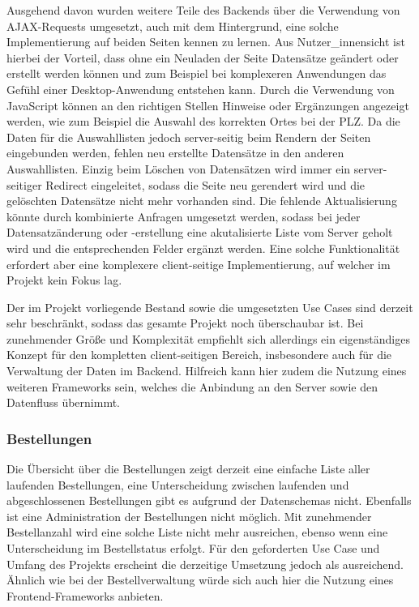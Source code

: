 		Ausgehend davon wurden weitere Teile des Backends über die Verwendung von AJAX-Requests umgesetzt, auch mit dem Hintergrund, eine solche Implementierung auf beiden Seiten kennen zu lernen. Aus Nutzer\_innensicht ist hierbei der Vorteil, dass ohne ein Neuladen der Seite Datensätze geändert oder erstellt werden können und zum Beispiel bei komplexeren Anwendungen das Gefühl einer Desktop-Anwendung entstehen kann. Durch die Verwendung von JavaScript können an den richtigen Stellen Hinweise oder Ergänzungen angezeigt werden, wie zum Beispiel die Auswahl des korrekten Ortes bei der PLZ. Da die Daten für die Auswahllisten jedoch server-seitig beim Rendern der Seiten eingebunden werden, fehlen neu erstellte Datensätze in den anderen Auswahllisten. Einzig beim Löschen von Datensätzen wird immer ein server-seitiger Redirect eingeleitet, sodass die Seite neu gerendert wird und die gelöschten Datensätze nicht mehr vorhanden sind. Die fehlende Aktualisierung könnte durch kombinierte Anfragen umgesetzt werden, sodass bei jeder Datensatzänderung oder -erstellung eine akutalisierte Liste vom Server geholt wird und die entsprechenden Felder ergänzt werden. Eine solche Funktionalität erfordert aber eine komplexere client-seitige Implementierung, auf welcher im Projekt kein Fokus lag.
		
		Der im Projekt vorliegende Bestand sowie die umgesetzten Use Cases sind derzeit sehr beschränkt, sodass das gesamte Projekt noch überschaubar ist. Bei zunehmender Größe und Komplexität empfiehlt sich allerdings ein eigenständiges Konzept für den kompletten client-seitigen Bereich, insbesondere auch für die Verwaltung der Daten im Backend. Hilfreich kann hier zudem die Nutzung eines weiteren Frameworks sein, welches die Anbindung an den Server sowie den Datenfluss übernimmt.
		
		\subsubsection{Bestellungen}
		Die Übersicht über die Bestellungen zeigt derzeit eine einfache Liste aller laufenden Bestellungen, eine Unterscheidung zwischen laufenden und abgeschlossenen Bestellungen gibt es aufgrund der Datenschemas nicht. Ebenfalls ist eine Administration der Bestellungen nicht möglich. Mit zunehmender Bestellanzahl wird eine solche Liste nicht mehr ausreichen, ebenso wenn eine Unterscheidung im Bestellstatus erfolgt. Für den geforderten Use Case und Umfang des Projekts erscheint die derzeitige Umsetzung jedoch als ausreichend. Ähnlich wie bei der Bestellverwaltung würde sich auch hier die Nutzung eines Frontend-Frameworks anbieten.
		
